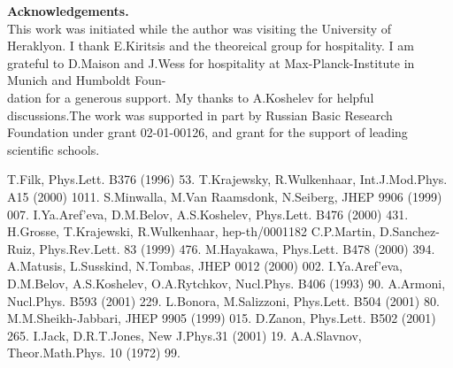 \documentclass[a4paper,12pt]{article}
\begin{document}
 {\bf Acknowledgements.} \\
This work was initiated while the author was visiting the University of 
 Heraklyon. I thank E.Kiritsis and the theoreical group for hospitality. I 
 am grateful to D.Maison and J.Wess for hospitality at 
 Max-Planck-Institute in Munich and Humboldt Foun-\\dation for a generous 
 support. My thanks to A.Koshelev for helpful discussions.The work was 
 supported in part by Russian Basic Research Foundation under grant 
 02-01-00126, and grant for the support of leading scientific schools.  
 \begin{thebibliography}{99}{\small {} T.Filk, Phys.Lett. B376 
 (1996) 53.  T.Krajewsky, R.Wulkenhaar, 
 Int.J.Mod.Phys. A15 (2000) 1011. 
   S.Minwalla, M.Van Raamsdonk, N.Seiberg, 
 JHEP 9906 (1999) 007. 
   I.Ya.Aref'eva, 
 D.M.Belov, A.S.Koshelev, Phys.Lett. B476 (2000) 431.  
 H.Grosse, T.Krajewski, R.Wulkenhaar, hep-th/0001182
 C.P.Martin, D.Sanchez-Ruiz, Phys.Rev.Lett. 83 (1999) 476. 
  M.Hayakawa, Phys.Lett. B478 (2000) 394. 
   A.Matusis, L.Susskind, N.Tombas, JHEP 0012 
 (2000) 002.  
 I.Ya.Aref'eva, D.M.Belov,  A.S.Koshelev, O.A.Rytchkov,  
Nucl.Phys. B406 (1993) 90.   A.Armoni, Nucl.Phys. B593 (2001) 
 229.   L.Bonora, M.Salizzoni, Phys.Lett. B504 (2001) 80.  
  M.M.Sheikh-Jabbari, JHEP 9905 (1999) 015.   
 D.Zanon, Phys.Lett.  B502 (2001) 265.   I.Jack, D.R.T.Jones, 
New J.Phys.31 (2001) 19.   A.A.Slavnov, 
Theor.Math.Phys.  10 (1972) 99.} \end{thebibliography} 
\end{document}
